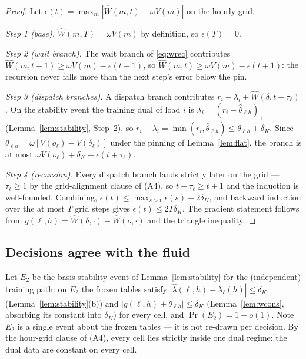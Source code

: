 \documentclass[11pt]{article}
\begin{document}
\begin{proof}
Let $\epsilon(t) = \max_m |\widehat{W}(m, t) - \omega V(m)|$ on the
hourly grid.

\emph{Step 1 (base).} $\widehat{W}(m, T) = \omega V(m)$ by definition,
so $\epsilon(T) = 0$.

\emph{Step 2 (wait branch).} The wait branch of \eqref{eq:wrec}
contributes $\widehat{W}(m, t{+}1) \geq \omega V(m) - \epsilon(t{+}1)$,
so $\widehat{W}(m, t) \geq \omega V(m) - \epsilon(t{+}1)$: the
recursion never falls more than the next step's error below the pin.

\emph{Step 3 (dispatch branches).} A dispatch branch contributes
$r_i - \lambda_i + \widehat{W}(\delta, t + \tau_{\ell})$. On the
stability event the training dual of load $i$ is
$\lambda_i = (r_i - \hat{\theta}_{\ell h})_+$
(Lemma~\ref{lem:stability}, Step~2), so
$r_i - \lambda_i = \min(r_i, \hat{\theta}_{\ell h}) \leq
\theta_{\ell h} + \delta_K$. Since
$\theta_{\ell h} = \omega [V(o_{\ell}) - V(\delta_{\ell})]$ under the
pinning of Lemma~\ref{lem:flat}, the branch is at most
$\omega V(o_{\ell}) + \delta_K + \epsilon(t + \tau_{\ell})$.

\emph{Step 4 (recursion).} Every dispatch branch lands strictly later
on the grid --- $\tau_{\ell} \geq 1$ by the grid-alignment clause of
(A4), so $t + \tau_{\ell} \geq t + 1$ and the induction is
well-founded. Combining,
$\epsilon(t) \leq \max_{s > t} \epsilon(s) + 2 \delta_K$, and backward
induction over the at most $T$ grid steps gives
$\epsilon(t) \leq 2 T \delta_K$. The gradient statement follows from
$g(\ell, h) = \widehat{W}(\delta, \cdot) - \widehat{W}(o, \cdot)$ and
the triangle inequality.
\end{proof}

\subsection{Decisions agree with the fluid}

Let $E_2$ be the basis-stability event of
Lemma~\ref{lem:stability} for the (independent) training path: on
$E_2$ the frozen tables satisfy
$|\hat{\lambda}(\ell, h) - \lambda_{\ell}(h)| \leq \delta_K$
(Lemma~\ref{lem:stability}(b)) and
$|g(\ell, h) + \theta_{\ell h}| \leq \delta_K$
(Lemma~\ref{lem:wcons}, absorbing its constant into $\delta_K$) for
every cell, and $\Pr(E_2) = 1 - o(1)$. Note $E_2$ is a single event
about the frozen tables --- it is not re-drawn per decision. By the
hour-grid clause of (A4), every cell lies strictly inside one dual
regime: the dual data are constant on every cell.
\end{document}
